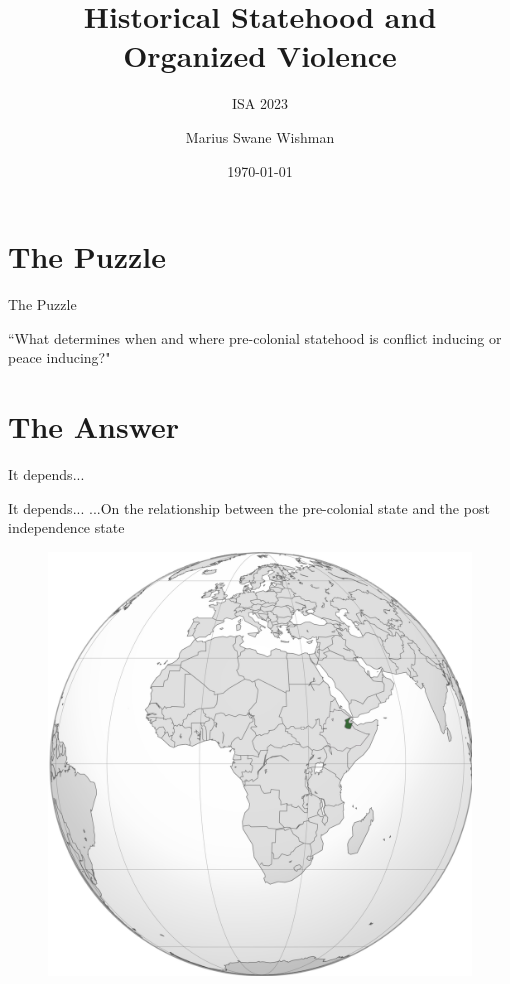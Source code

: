 \documentclass{beamer}
\title[ISA 2023]{Historical Statehood and Organized Violence}
\subtitle{ISA 2023}
\author[Wishman]{Marius Swane Wishman}
\date{\today}
\institute{NTNU}
\begin{document}
\begin{frame}[plain]
\titlepage 
\end{frame}

\section{The Puzzle}

\begin{frame}
	\centering
	\Large The Puzzle
\end{frame}

\begin{frame} 
	\centering
	\Large ``What determines when and where pre-colonial
	statehood is conflict inducing or peace inducing?"

\end{frame}

\section{The Answer}

\begin{frame} 
	\centering
	\Large It depends...
\end{frame}

\begin{frame}{It depends...}
	\centering
	\Large ...On the relationship between the pre-colonial state and the
	post independence state
\end{frame}

\begin{frame}
	\begin{figure}
		\includegraphics[width=.7\linewidth]{img/aussa.png}
	\end{figure}
\end{frame}
\end{document}
